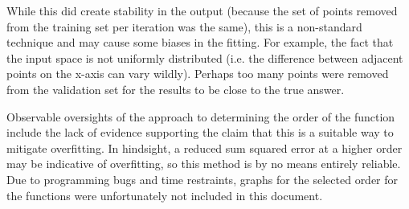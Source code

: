 \documentclass{article}
\begin{document}
While this did create stability in the output (because the set of points removed from the training set per iteration was the same), this is a non-standard technique and may cause some biases in the fitting. For example, the fact that the input space is not uniformly distributed (i.e. the difference between adjacent points on the x-axis can vary wildly). Perhaps too many points were removed from the validation set for the results to be close to the true answer. 

Observable oversights of the approach to determining the order of the function include the lack of evidence supporting the claim that this is a suitable way to mitigate overfitting. In hindsight, a reduced sum squared error at a higher order may be indicative of overfitting, so this method is by no means entirely reliable. Due to programming bugs and time restraints, graphs for the selected order for the functions were unfortunately not included in this document.
\end{document}
